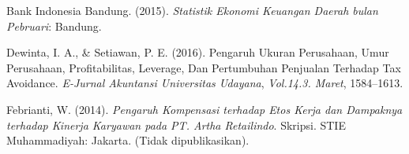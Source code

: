 \begin{list}{}{\leftmargin=1.25cm \itemindent=-1.25cm \itemsep=8pt \small}

    \item Bank Indonesia Bandung. (2015). \textit{Statistik Ekonomi Keuangan Daerah bulan Pebruari}: Bandung.

    \item Dewinta, I. A., \& Setiawan, P. E. (2016). Pengaruh Ukuran Perusahaan, Umur
          Perusahaan, Profitabilitas, Leverage, Dan Pertumbuhan Penjualan Terhadap Tax
          Avoidance. \textit{E-Jurnal Akuntansi Universitas Udayana}, \textit{Vol.14.3. Maret}, 1584--1613.

    \item Febrianti, W. (2014). \textit{Pengaruh Kompensasi terhadap Etos Kerja dan Dampaknya
              terhadap Kinerja Karyawan pada PT. Artha Retailindo}. Skripsi. STIE
          Muhammadiyah: Jakarta. (Tidak dipublikasikan).

\end{list}